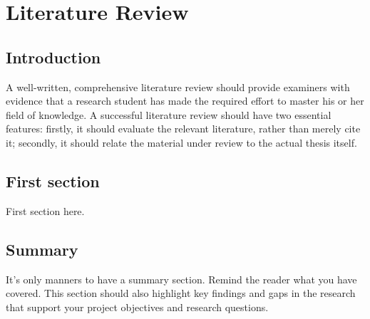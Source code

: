 \chapter{Literature Review}\label{chapter:lit-review}

\section{Introduction}\label{sec:lit-review-intro}
A well-written, comprehensive literature review should provide examiners with evidence that a research student has made the required effort to master his or her field of knowledge. A successful literature review should have two essential features: firstly, it should evaluate the relevant literature, rather than merely cite it; secondly, it should relate the material under review to the actual thesis itself.

\section{First section}\label{sec:lit-review-first-section}
First section here.

\section{Summary}\label{sec:lit-review-summary}
It's only manners to have a summary section. Remind the reader what you have covered. This section should also highlight key findings and gaps in the research that support your project objectives and research questions.